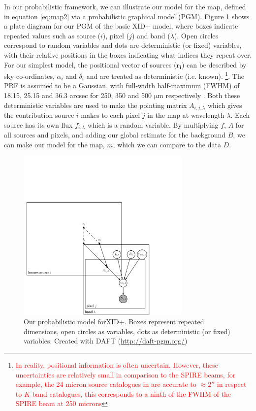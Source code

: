 \documentclass[useAMS,usenatbib]{mnras}
\begin{document}
In our probabilistic framework, we can illustrate our model for the map, defined in equation \ref{eq:map2} via a probabilistic graphical model (PGM). Figure \ref{fig:graph_mod_xid+} shows a plate diagram \citep{Bishop:2006} for our PGM of the basic XID+ model, where boxes  indicate repeated values such as source ($i$), pixel ($j$) and band ($\lambda$). Open circles correspond to random variables and dots are deterministic (or fixed) variables, with their relative positions in the boxes indicating what indices they repeat over. For our simplest model, the positional vector of sources ($\mathbf{r_i}$) can be described by sky co-ordinates, $\alpha_i$ and $\delta_i$ and are treated as deterministic (i.e. known). \footnote{\textcolor{red}{In reality, positional information is often uncertain. However, these uncertainties are relatively small in comparison to the SPIRE beams, for example, the 24 micron source catalogues in \citep{LeFLoch:2009} are accurate to $\approx 2''$ in respect to $K$ band catalogues, this corresponds to a ninth of the FWHM of the SPIRE beam at 250 microns}}. The PRF is assumed to be a Gaussian, with full-width half-maximum (FWHM) of 18.15, 25.15 and 36.3 arcsec for 250, 350 and 500 $\mathrm{\mu m}$ respectively \citep{Griffin:2010}. Both these deterministic variables are used to make the pointing matrix $A_{i,j,\lambda}$ which gives the contribution source $i$ makes to each pixel $j$ in the map at wavelength $\lambda$. Each source has its own flux $f_{i,\lambda}$ which is a random variable. By multiplying $f$, $A$ for all sources and pixels, and adding our global estimate for the background $B$, we can make our model for the map, $m$, which we can compare to the data $D$. 
\begin{figure}
\includegraphics[width=8.5cm]{./graphical_model.pdf}
\caption{Our probabilistic model for\textsc{XID+}. Boxes represent repeated dimensions, open circles as variables, dots as deterministic (or fixed) variables. Created with DAFT (\url{http://daft-pgm.org/})}\label{fig:graph_mod_xid+}
\end{figure}
 
\end{document}
